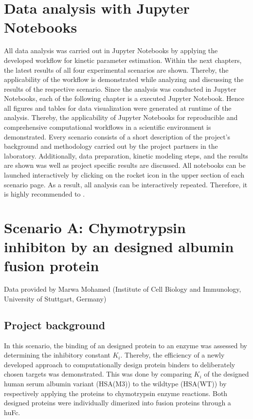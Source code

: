 \documentclass[letterpaper,12pt,english]{jupyterBook}
\begin{document}
\section{Data analysis with Jupyter Notebooks}
\label{\detokenize{results:data-analysis-with-jupyter-notebooks}}
\sphinxAtStartPar
All data analysis was carried out in Jupyter Notebooks by applying the developed workflow for kinetic parameter estimation. Within the next chapters, the latest results of all four experimental scenarios are shown. Thereby, the applicability of the workflow is demonstrated while analyzing and discussing the results of the respective scenario.
Since the analysis was conducted in Jupyter Notebooks, each of the following chapter is a executed Jupyter Notebook. Hence all figures and tables for data visualization were generated at runtime of the analysis.
Thereby, the applicability of Jupyter Notebooks for reproducible and comprehensive computational workflows in a scientific environment is demonstrated.
Every scenario consists of a short description of the project’s background and methodology carried out by the project partners in the laboratory. Additionally, data preparation, kinetic modeling steps, and the results are shown was well as project specific results are discussed.
All notebooks can be launched interactively by clicking on the rocket icon in the upper section of each scenario page. As a result, all analysis can be interactively repeated. Therefore, it is highly recommended to .

\sphinxstepscope

\newpage
\section{Scenario A: Chymotrypsin inhibiton by an  designed albumin fusion protein}
\label{\detokenize{scenarios/chymotrypsin_inhibition:scenario-a-br-chymotrypsin-inhibiton-by-an-in-silico-designed-albumin-fusion-protein}}\label{\detokenize{scenarios/chymotrypsin_inhibition::doc}}
\sphinxAtStartPar
Data provided by Marwa Mohamed (Institute of Cell Biology and Immunology, University of Stuttgart, Germany)


\subsection{Project background}
\label{\detokenize{scenarios/chymotrypsin_inhibition:project-background}}
\sphinxAtStartPar
In this scenario, the binding of an  designed protein to an enzyme was assessed by determining the inhibitory constant \(K_{i}\). Thereby, the efficiency of a newly developed approach to computationally design protein binders to deliberately chosen targets was demonstrated.
This was done by comparing \(K_{i}\) of the designed human serum albumin variant (HSA(M3)) to the wild\sphinxhyphen{}type (HSA(WT)) by respectively applying the proteins to chymotrypsin enzyme reactions. Both designed proteins were individually dimerized into fusion proteins through a huFc.
\end{document}
